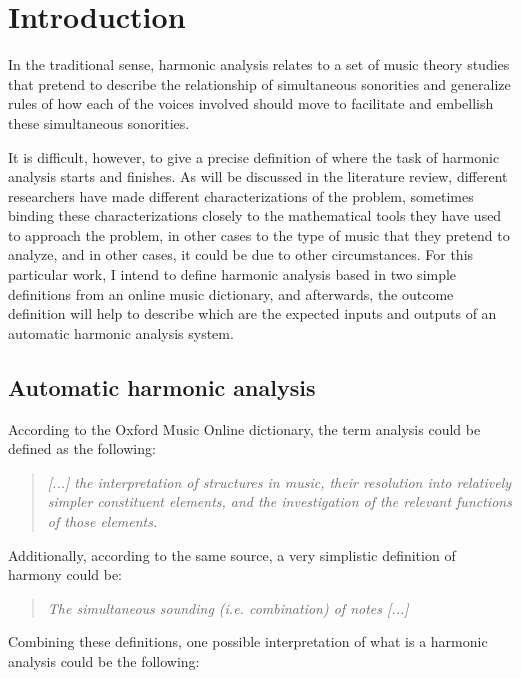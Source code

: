 \chapter{Introduction}
In the traditional sense, harmonic analysis relates to a set of music theory studies that pretend to describe the relationship of simultaneous sonorities and generalize rules of how each of the voices involved should move to facilitate and embellish these simultaneous sonorities.

It is difficult, however, to give a precise definition of where the task of harmonic analysis starts and finishes. As will be discussed in the literature review, different researchers have made different characterizations of the problem, sometimes binding these characterizations closely to the mathematical tools they have used to approach the problem, in other cases to the type of music that they pretend to analyze, and in other cases, it could be due to other circumstances. For this particular work, I intend to define harmonic analysis based in two simple definitions from an online music dictionary, and afterwards, the outcome definition will help to describe which are the expected inputs and outputs of an automatic harmonic analysis system.

\section{Automatic harmonic analysis}
According to the Oxford Music Online dictionary, the term analysis could be defined as the following: \cite{oxfordanalysis}

\begin{quote}
\centering
\emph{[...] the interpretation of structures in music, \linebreak
their resolution into relatively simpler constituent elements, \linebreak and the investigation of the relevant functions of those elements.}
\end{quote}

Additionally, according to the same source, a very simplistic definition of harmony could be: \cite{oxfordharmony}

\begin{quote}
\centering
\emph{The simultaneous sounding (i.e. combination) of notes [...]}
\end{quote}

Combining these definitions, one possible interpretation of what is a harmonic analysis could be the following:

